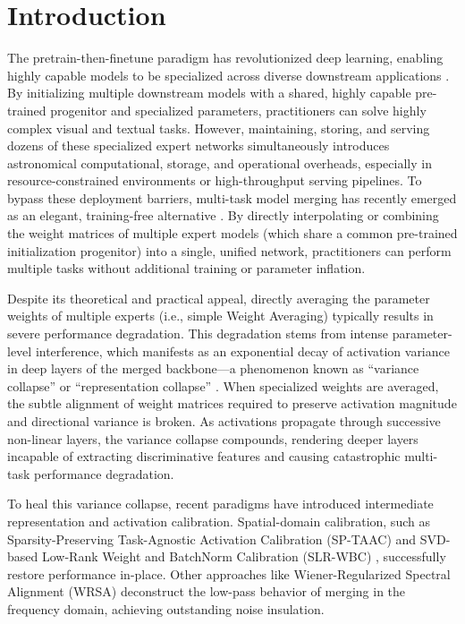\documentclass{article}
\theoremstyle{plain}
\theoremstyle{definition}
\theoremstyle{remark}
\begin{document}
\printAffiliationsAndNotice{}

\section{Introduction}
\label{submission:intro}
The pretrain-then-finetune paradigm has revolutionized deep learning, enabling highly capable models to be specialized across diverse downstream applications \cite{he2016deep, wortsman2022model, maddox2019asimple}. By initializing multiple downstream models with a shared, highly capable pre-trained progenitor and specialized parameters, practitioners can solve highly complex visual and textual tasks. However, maintaining, storing, and serving dozens of these specialized expert networks simultaneously introduces astronomical computational, storage, and operational overheads, especially in resource-constrained environments or high-throughput serving pipelines. To bypass these deployment barriers, multi-task model merging has recently emerged as an elegant, training-free alternative \cite{wortsman2022model, ilharco2022editing, yadav2023ties}. By directly interpolating or combining the weight matrices of multiple expert models (which share a common pre-trained initialization progenitor) into a single, unified network, practitioners can perform multiple tasks without additional training or parameter inflation.

Despite its theoretical and practical appeal, directly averaging the parameter weights of multiple experts (i.e., simple Weight Averaging) typically results in severe performance degradation. This degradation stems from intense parameter-level interference, which manifests as an exponential decay of activation variance in deep layers of the merged backbone---a phenomenon known as ``variance collapse'' or ``representation collapse'' \cite{jordan2023repair, slrwbc2026, wrsa2026, marczak2025notask}. When specialized weights are averaged, the subtle alignment of weight matrices required to preserve activation magnitude and directional variance is broken. As activations propagate through successive non-linear layers, the variance collapse compounds, rendering deeper layers incapable of extracting discriminative features and causing catastrophic multi-task performance degradation.

To heal this variance collapse, recent paradigms have introduced intermediate representation and activation calibration. Spatial-domain calibration, such as Sparsity-Preserving Task-Agnostic Activation Calibration (SP-TAAC) \cite{mspr2026} and SVD-based Low-Rank Weight and BatchNorm Calibration (SLR-WBC) \cite{slrwbc2026}, successfully restore performance in-place. Other approaches like Wiener-Regularized Spectral Alignment (WRSA) \cite{wrsa2026} deconstruct the low-pass behavior of merging in the frequency domain, achieving outstanding noise insulation. 
\end{document}
